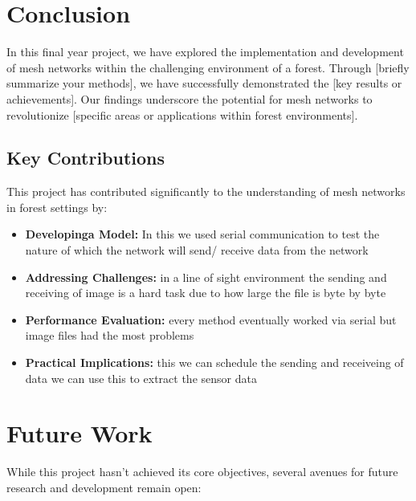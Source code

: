 \section{Conclusion}
\label{ch:conclusion} %

In this final year project, we have explored the implementation and development of mesh networks within the challenging environment of a forest. Through [briefly summarize your methods], we have successfully demonstrated the [key results or achievements]. Our findings underscore the potential for mesh networks to revolutionize [specific areas or applications within forest environments].

\subsection{Key Contributions}

This project has contributed significantly to the understanding of mesh networks in forest settings by:

\begin{itemize}
    \item \textbf{Developinga Model:} In this we used serial communication to test the nature of  which the network will send/ receive data from the network 
    \item \textbf{Addressing Challenges:} in a line of sight environment the sending and receiving of image is a hard task due to  how large the file is byte by byte
    \item \textbf{Performance Evaluation:} every method eventually worked via serial but image files had the  most problems
    \item \textbf{Practical Implications:} this we can schedule the sending  and  receiveing  of data we can use this to extract the sensor data
\end{itemize}

\section{Future Work}

While this project hasn't achieved its core objectives, several avenues for future research and development remain open:

